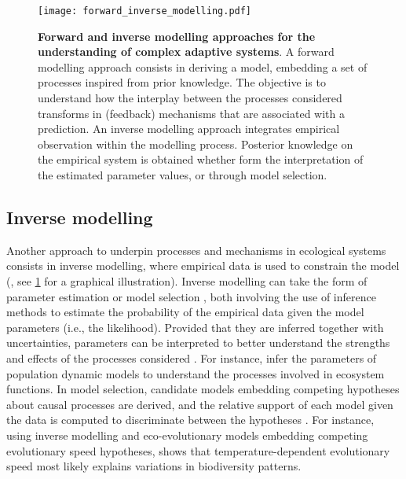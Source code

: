 \begin{figure}[t]
    \centering
    \texttt{[image: forward\_inverse\_modelling.pdf]}
    \caption{\textbf{Forward and inverse modelling approaches for the understanding of complex adaptive systems}. A forward modelling approach consists in deriving a model, embedding a set of processes inspired from prior knowledge. The objective is to understand how the interplay between the processes considered transforms in (feedback) mechanisms that are associated with a prediction. An inverse modelling approach integrates empirical observation within the modelling process. Posterior knowledge on the empirical system is obtained whether form the interpretation of the estimated parameter values, or through model selection.
    }
    \label{fig:forward_inverse_modelling}
\end{figure}

\subsection{Inverse modelling}
Another approach to underpin processes and mechanisms in ecological systems consists in inverse modelling, where empirical data is used to constrain the model (\cite{Clermont2015}, see \cref{fig:forward_inverse_modelling} for a graphical illustration).
% 
Inverse modelling can take the form of parameter estimation \citep{Schartau2017} or model selection \citep{Johnson2004}, both involving the use of inference methods to estimate the probability of the empirical data given the model parameters (i.e., the likelihood).
% 
Provided that they are inferred together with uncertainties, parameters can be interpreted to better understand the strengths and effects of the processes considered \citep{Pontarp2019}. For instance, \cite{Higgins2010,Curtsdotter2019} infer the parameters of population dynamic models to understand the processes involved in ecosystem functions.
%
In model selection, candidate models embedding competing hypotheses about causal processes are derived, and the relative support of each model given the data is computed to discriminate between the hypotheses \citep{Johnson2004}. For instance, using inverse modelling and eco-evolutionary models embedding competing evolutionary speed hypotheses, \cite{Skeels2022} shows that temperature-dependent evolutionary speed most likely explains variations in biodiversity patterns.

